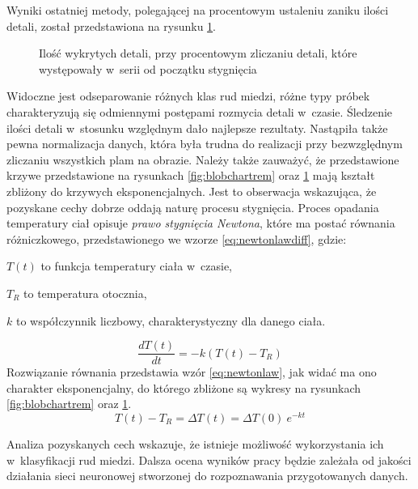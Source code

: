 Wyniki ostatniej metody, polegającej na procentowym ustaleniu zaniku ilości
detali, został przedstawiona na rysunku \ref{fig:blobcharperc}.
\begin{figure}[htbp]
    \centering
    
    \caption{Ilość wykrytych detali, przy procentowym zliczaniu detali, które
             występowały w~serii od początku stygnięcia}
    \label{fig:blobcharperc}
\end{figure}
Widoczne jest odseparowanie różnych klas rud miedzi, różne typy próbek
charakteryzują się odmiennymi postępami rozmycia detali w~czasie.
Śledzenie ilości detali w~stosunku względnym dało najlepsze rezultaty.
Nastąpiła także pewna normalizacja danych, która była trudna do realizacji
przy bezwzględnym zliczaniu wszystkich plam na obrazie.
Należy także zauważyć, że przedstawione krzywe przedstawione na rysunkach
\ref{fig:blobchartrem} oraz \ref{fig:blobcharperc} mają kształt zbliżony
do krzywych eksponencjalnych.
Jest to obserwacja wskazująca, że pozyskane cechy dobrze oddają naturę procesu
stygnięcia.
Proces opadania temperatury ciał opisuje \emph{prawo stygnięcia Newtona},
które ma postać równania różniczkowego, przedstawionego we wzorze
\ref{eq:newtonlawdiff}, gdzie:
\begin{description}
	\item $ T \left( t \right) $ to funkcja temperatury ciała w~czasie,
	\item $ T_R $ to temperatura otocznia,
	\item $ k $ to współczynnik liczbowy, charakterystyczny dla danego ciała.
\end{description}

\begin{equation}
	\frac{dT \left( t \right)}{dt}=-k\left( T \left( t \right) -T_{R} \right)
\label{eq:newtonlawdiff}
\end{equation}
Rozwiązanie równania przedstawia wzór \ref{eq:newtonlaw}, jak widać ma ono
charakter eksponencjalny, do którego zbliżone są wykresy na rysunkach
\ref{fig:blobchartrem} oraz \ref{fig:blobcharperc}.
\begin{equation}
	T(t) - T_{R} = \Delta T (t) = \Delta T (0) \ e^ {-k t}
\label{eq:newtonlaw}
\end{equation}

Analiza pozyskanych cech wskazuje, że istnieje możliwość wykorzystania ich
w~klasyfikacji rud miedzi.
Dalsza ocena wyników pracy będzie zależała od jakości działania sieci
neuronowej stworzonej do rozpoznawania przygotowanych danych.
